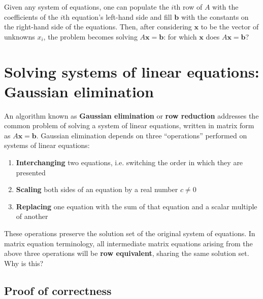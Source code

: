 \documentclass[draft,12pt]{report}
\renewcommand{\vec}[1]{\mathbf{#1}}
\begin{document}
Given any system of equations, one can populate the $i$th row of $A$ with the coefficients of the $i$th equation's left-hand side and fill $\vec{b}$ with the constants on the right-hand side of the equations. Then, after considering $\vec{x}$ to be the vector of unknowns $x_i$, the problem becomes solving $A\vec{x} = \vec{b}$: for which $\vec{x}$ does $A\vec{x} = \vec{b}$?

\section{Solving systems of linear equations: Gaussian elimination}

An algorithm known as \textbf{Gaussian elimination} or \textbf{row reduction} addresses the common problem of solving a system of linear equations, written in matrix form as $A\vec{x} = \vec{b}$. Gaussian elimination depends on three ``operations'' performed on systems of linear equations:
\begin{enumerate}
    \item \textbf{Interchanging} two equations, i.e. switching the order in which they are presented
    \item \textbf{Scaling} both sides of an equation by a real number $c \neq 0$
    \item \textbf{Replacing} one equation with the sum of that equation and a scalar multiple of another
\end{enumerate}

These operations preserve the solution set of the original system of equations. In matrix equation terminology, all intermediate matrix equations arising from the above three operations will be \textbf{row equivalent}, sharing the same solution set. Why is this?

\subsection{Proof of correctness}
\end{document}
